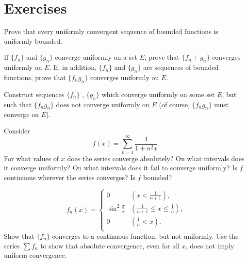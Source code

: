 \section{Exercises}

\begin{myExercise}
    \label{ex:7.1}
    Prove that every uniformly convergent sequence of bounded functions is uniformly bounded.
\end{myExercise}


\begin{myExercise}
    \label{ex:7.2}
    If $\{f_n\}$ and $\{g_n\}$ converge uniformly on a set $E$, prove that $\{f_n+g_n\}$ converges uniformly on $E$.
    If, in addition, $\{f_n\}$ and $\{g_n\}$ are sequences of bounded functions, prove that $\{f_n g_n\}$ converges uniformly on $E$.
\end{myExercise}


\begin{myExercise}
    \label{ex:7.3}
    Construct sequences $\{f_n\}$ , $\{g_n\}$ which converge uniformly on some set $E$, but such that $\{f_n g_n\}$ 
    does not converge uniformly on $E$ 
    (of course, $\{f_n g_n\}$ must converge on $E$).
\end{myExercise}


\begin{myExercise}
    \label{ex:7.4}
    Consider 
    \begin{equation*}
        f(x) = \sum_{n=1}^{\infty} \frac{1}{1+n^2x} .
    \end{equation*}
    For what values of $x$ does the series converge absolutely?
    On what intervals does it converge uniformly?
    On what intervals does it fail to converge uniformly?
    Is $f$ continuous wherever the series converges?
    Is $f$ bounded?
\end{myExercise}


\begin{myExercise}
    \label{ex:7.5}
    \begin{equation*}
        f_n(x) = \left\{ 
            \begin{array}{ll}
                0 & \left( x<\frac{1}{n+1} \right), \\
                \sin^2 \frac{\pi}{x} & \left( \frac{1}{n+1}\leq x \leq \frac{1}{n} \right), \\
                0 & \left( \frac{1}{n} < x \right). \\ 
            \end{array}
         \right.
    \end{equation*}
    Show that $\{f_n\}$ converges to a continuous function, but not uniformly. 
    Use the series $\sum f_n$ to show that absolute convergence, even for all $x$, does not imply uniform convergence.
\end{myExercise}



